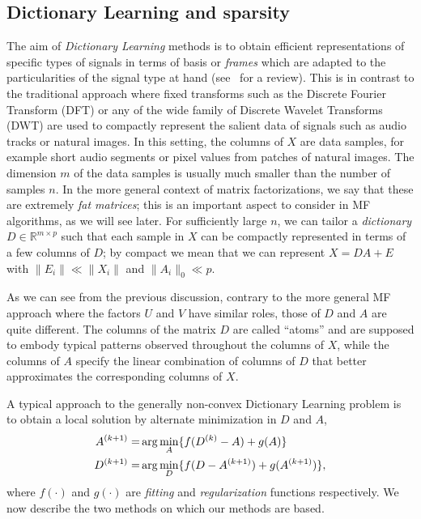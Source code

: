 \documentclass[twocolumn]{IEEEtran}
\theoremstyle{definition}
\def\reals{\ensuremath{\mathbb{R}}}
\begin{document}
\subsection{Dictionary Learning and sparsity}
\label{sec:background:dictionary-learning}
%
The aim of \emph{Dictionary Learning} methods is to obtain efficient representations of specific types of signals in terms of basis or \emph{frames} which are adapted to the particularities of the signal type at hand (see~\cite{dl-review} for a review). This is in contrast to the traditional approach where fixed transforms such as the Discrete Fourier Transform (DFT) or any of the wide family of Discrete Wavelet Transforms (DWT) are used to compactly represent the salient data of signals such as audio tracks or natural images. In this setting, the columns of $X$ are data samples, for example short audio segments or pixel values from patches of natural images. The dimension $m$ of the data samples is usually much smaller than the number of samples $n$. In the more general context of matrix factorizations, we say that these are extremely \emph{fat matrices}; this is an important aspect to consider in MF algorithms, as we will see later.
For sufficiently large $n$, we can tailor a \emph{dictionary} $D \in \reals^{m{\times}p}$ such that each sample in $X$ can be compactly represented in terms of a few columns of $D$; by compact we mean that we can represent $X=DA+E$ with $\|E_i\| \ll \|X_i\|$ and $\|A_i\|_0 \ll p$.

As we can see from the previous discussion, contrary to the more general MF approach where the factors $U$ and $V$ have similar roles, those of $D$ and $A$ are quite different. The columns of the matrix $D$ are called ``atoms'' and are supposed to embody typical patterns observed throughout the columns of $X$, while the columns of $A$ specify the linear combination of columns of $D$ that better approximates the corresponding columns of $X$.

A typical approach to the generally non-convex Dictionary Learning problem is to obtain a local solution by alternate minimization in $D$ and $A$,
%
\begin{eqnarray}
A\iter{k+1} =& \arg\min_{A} \{ f(D\iter{k}-A) + g(A) \} \\
D\iter{k+1} =& \arg\min_{D} \{ f(D-A\iter{k+1}) + g(A\iter{k+1}) \},
\label{eq:dl}
\end{eqnarray}
%
where $f(\cdot)$ and $g(\cdot)$ are \emph{fitting} and \emph{regularization} functions respectively. We now describe  the two  methods on which our methods are based.
\end{document}
